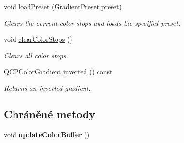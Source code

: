 \begin{DoxyCompactItemize}
\item 
void \hyperlink{classQCPColorGradient_aa0aeec1528241728b9671bf8e60b1622}{load\+Preset} (\hyperlink{classQCPColorGradient_aed6569828fee337023670272910c9072}{Gradient\+Preset} preset)
\begin{DoxyCompactList}\small\item\em Clears the current color stops and loads the specified {\itshape preset}. \end{DoxyCompactList}\item 
void \hyperlink{classQCPColorGradient_a939213e85f0d1279519d555c5fcfb6ad}{clear\+Color\+Stops} ()
\begin{DoxyCompactList}\small\item\em Clears all color stops. \end{DoxyCompactList}\item 
\hyperlink{classQCPColorGradient}{Q\+C\+P\+Color\+Gradient} \hyperlink{classQCPColorGradient_abe04e1d1ccab3d7aa78f2924faed4916}{inverted} () const 
\begin{DoxyCompactList}\small\item\em Returns an inverted gradient. \end{DoxyCompactList}\end{DoxyCompactItemize}
\subsection*{Chráněné metody}
\begin{DoxyCompactItemize}
\item 
\hypertarget{classQCPColorGradient_a353f15ab3ab586eebf1f6b58c3e2707b}{}void {\bfseries update\+Color\+Buffer} ()\label{classQCPColorGradient_a353f15ab3ab586eebf1f6b58c3e2707b}

\end{DoxyCompactItemize}
